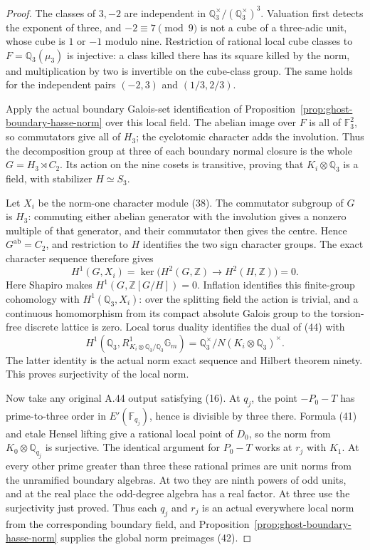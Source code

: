\begin{proof}
The classes of \(3,-2\) are independent in
\(\mathbb Q_3^\times/(\mathbb Q_3^\times)^3\).
Valuation first detects the exponent of three, and
\(-2\equiv7\pmod9\) is not a cube of a three-adic
unit, whose cube is \(1\) or \(-1\) modulo nine.
Restriction of rational local cube classes to
\(F=\mathbb Q_3(\mu_3)\) is injective: a class killed
there has its square killed by the norm, and
multiplication by two is invertible on the cube-class
group. The same holds for the independent pairs
\((-2,3)\) and \((1/3,2/3)\).

Apply the actual boundary Galois-set identification
of Proposition~\ref{prop:ghost-boundary-hasse-norm}
over this local field. The abelian image over \(F\)
is all of \(\mathbb F_3^2\), so commutators give all
of \(H_3\); the cyclotomic character adds the
involution. Thus the decomposition group at three
of each boundary normal closure is the whole
\(G=H_3\rtimes C_2\). Its action on the nine cosets
is transitive, proving that \(K_i\otimes\mathbb Q_3\)
is a field, with stabilizer \(H\simeq S_3\).

Let \(X_i\) be the norm-one character module (38).
The commutator subgroup of \(G\) is \(H_3\):
commuting either abelian generator with the
involution gives a nonzero multiple of that
generator, and their commutator then gives the
centre. Hence \(G^{\mathrm{ab}}=C_2\), and
restriction to \(H\) identifies the two sign
character groups. The exact character sequence
therefore gives
\[
 H^1(G,X_i)=
 \ker\bigl(H^2(G,\mathbb Z)
       \longrightarrow H^2(H,\mathbb Z)\bigr)=0.
                                                        \tag{44}
\]
Here Shapiro makes \(H^1(G,\mathbb Z[G/H])=0\).
Inflation identifies this finite-group cohomology
with \(H^1(\mathbb Q_3,X_i)\): over the splitting
field the action is trivial, and a continuous
homomorphism from its compact absolute Galois
group to the torsion-free discrete lattice is zero.
Local torus duality
\cite[Corollary I.2.4, printed pages 28--29]{GhostMilneADT}
identifies the dual of (44) with
\[
 H^1(\mathbb Q_3,R^1_{K_i\otimes\mathbb Q_3/\mathbb Q_3}
             \mathbb G_m)
 =\mathbb Q_3^\times/
        N(K_i\otimes\mathbb Q_3)^\times.
\]
The latter identity is the actual norm exact
sequence and Hilbert theorem ninety. This proves
surjectivity of the local norm.

Now take any original A.44 output satisfying (16).
At \(q_j\), the point \(-P_0-T\) has prime-to-three
order in \(E'(\mathbb F_{q_j})\), hence is divisible
by three there. Formula (41) and etale Hensel lifting
give a rational local point of \(D_0\), so the norm
from \(K_0\otimes\mathbb Q_{q_j}\) is surjective.
The identical argument for \(P_0-T\) works at
\(r_j\) with \(K_1\). At every other prime greater
than three these rational primes are unit norms
from the unramified boundary algebras. At two they
are ninth powers of odd units, and at the real place
the odd-degree algebra has a real factor. At three
use the surjectivity just proved. Thus each \(q_j\)
and \(r_j\) is an actual everywhere local norm from
the corresponding boundary field, and
Proposition~\ref{prop:ghost-boundary-hasse-norm}
supplies the global norm preimages (42).


\end{proof}
